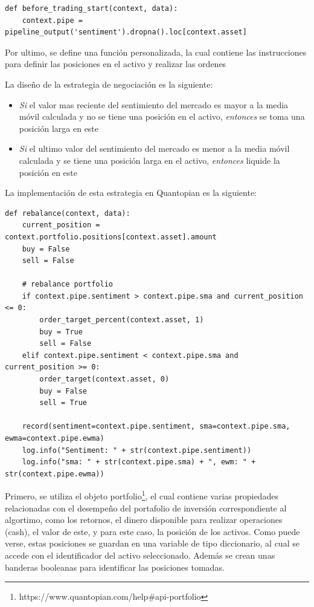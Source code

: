 \documentclass[a4paper, 11pt, twocolumn]{article}
\begin{document}
\begin{lstlisting}
def before_trading_start(context, data):
    context.pipe = pipeline_output('sentiment').dropna().loc[context.asset]
\end{lstlisting}

Por ultimo, se define una función personalizada, la cual contiene las instrucciones para definir las posiciones en el activo y realizar las ordenes

La diseño de la estrategia de negociación es la siguiente:

\begin{itemize}
    \item \textit{Si} el valor mas reciente del sentimiento del mercado es mayor a la media móvil calculada y no se tiene una posición en el activo, \textit{entonces} se toma una posición larga en este
    \item \textit{Si} el ultimo valor del sentimiento del mercado es menor a la media móvil calculada y se tiene una posición larga en el activo, \textit{entonces} liquide la posición en este
\end{itemize}

La implementación de esta estrategia en Quantopian es la siguiente:

\begin{lstlisting}
def rebalance(context, data):
    current_position = context.portfolio.positions[context.asset].amount
    buy = False
    sell = False
        
    # rebalance portfolio
    if context.pipe.sentiment > context.pipe.sma and current_position <= 0:
        order_target_percent(context.asset, 1)
        buy = True
        sell = False
    elif context.pipe.sentiment < context.pipe.sma and current_position >= 0:
        order_target(context.asset, 0)
        buy = False
        sell = True
        
    record(sentiment=context.pipe.sentiment, sma=context.pipe.sma, ewma=context.pipe.ewma)
    log.info("Sentiment: " + str(context.pipe.sentiment))
    log.info("sma: " + str(context.pipe.sma) + ", ewm: " + str(context.pipe.ewma))
\end{lstlisting}

Primero, se utiliza el objeto portfolio\footnote{https://www.quantopian.com/help\#api-portfolio}, el cual contiene varias propiedades relacionadas con el desempeño del portafolio de inversión correspondiente al algortimo, como los retornos, el dinero disponible para realizar operaciones (cash), el valor de este, y para este caso, la posición de los activos. Como puede verse, estas posiciones se guardan en una variable de tipo diccionario, al cual se accede con el identificador del activo seleccionado. Además se crean unas banderas booleanas para identificar las posiciones tomadas.
\end{document}
